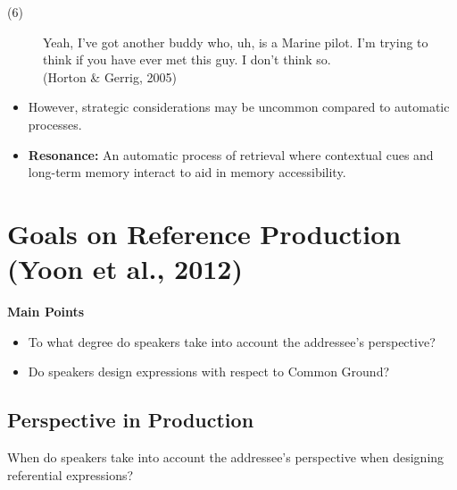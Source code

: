 \documentclass{article}
\begin{document}
\begin{multicols}{2}
\begin{description}
	\item[(6)] Yeah, I've got another buddy who, uh, is a Marine pilot. I'm trying to think if you have ever met this guy. I don't think so.\\
	\hfill (Horton \& Gerrig, 2005)
\end{description}
\begin{itemize}
	\item However, strategic considerations may be uncommon compared to automatic processes.
	\item \textbf{Resonance:} An automatic process of retrieval where contextual cues and long-term memory interact to aid in memory accessibility. 
\end{itemize}
\section{Goals on Reference Production (Yoon et al., 2012)}

\textbf{Main Points}
\begin{itemize}
	\item To what degree do speakers take into account the addressee’s perspective?
	\item Do speakers design expressions with respect to Common Ground?
\end{itemize}
\subsection{Perspective in Production}
When do speakers take into account the addressee's perspective when designing referential expressions?\\


\end{multicols}
\end{document}

